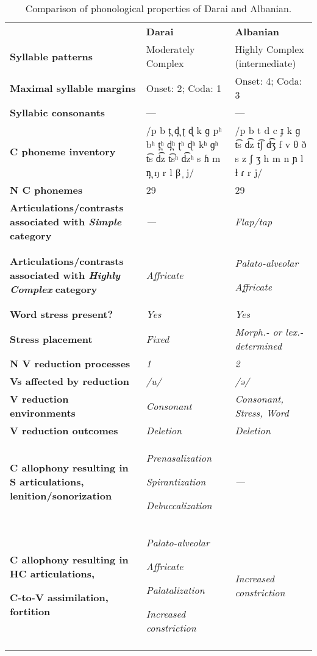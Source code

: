 \begin{table}
\begin{tabularx}{\textwidth}{XXX}
\lsptoprule
 & \textbf{Darai} & \textbf{Albanian}\\
 \textbf{Syllable patterns} & Moderately Complex & Highly Complex (intermediate)\\
 \textbf{Maximal syllable margins} & Onset: 2; Coda: 1 & Onset: 4; Coda: 3\\
 \textbf{Syllabic consonants} & — & —\\
 \textbf{C phoneme inventory} & /p b t̪ d̪ ʈ ɖ k ɡ pʰ bʰ t̪ʰ d̪ʰ ʈʰ ɖʰ kʰ ɡʰ t͡s d͡z t͡sʰ d͡zʰ s ɦ m n̪ ŋ r l β ̞ j/ & /p b t d c ɟ k ɡ t͡s d͡z t͡ʃ d͡ʒ f v θ ð s z ʃ ʒ h m n ɲ l ɫ ɾ r j/\\
 \textbf{N C phonemes} & 29 & 29\\
 \textbf{Articulations/contrasts associated with \textit{Simple}} \textbf{category} & \textit{—} & \textit{Flap/tap}\\
 \textbf{Articulations/contrasts associated with \textit{Highly Complex}} \textbf{category} & \textit{Affricate} & { \textit{Palato-alveolar}}

 \textit{Affricate}\\
 \textbf{Word stress present?} & \textit{Yes} & \textit{Yes}\\
 \textbf{Stress placement} & \textit{Fixed} & \textit{Morph.- or lex.-determined}\\
 \textbf{N V reduction processes} & \textit{1} & \textit{2}\\
 \textbf{Vs affected by reduction}  & \textit{/u/} & \textit{/ə/}\\
 \textbf{V reduction environments} & \textit{Consonant} & \textit{Consonant, Stress, Word}\\
 \textbf{V reduction outcomes} & \textit{Deletion} & \textit{Deletion}\\
 \textbf{C allophony resulting in S articulations, lenition/sonorization} & { \textit{Prenasalization}}

{ \textit{Spirantization}}

 \textit{Debuccalization} & \textit{—}\\
{ \textbf{C allophony resulting in HC articulations,} }

 \textbf{C-to-V assimilation, fortition} & { \textit{Palato-alveolar}}

{ \textit{Affricate}}

{ \textit{Palatalization}}

 \textit{Increased constriction} & \textit{Increased constriction}\\
\lspbottomrule
\end{tabularx}
\caption{\label{tab:8.6}Comparison of phonological properties of Darai and Albanian.}
\end{table}

